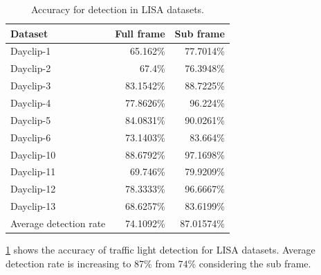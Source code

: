 \begin{table}[h!]
  \centering
  \caption{Accuracy for detection in LISA datasets.}
  \label{t:lisa_acc_stat}
  \begin{tabular}{  l  r  r }
    \rowcolor{gray!50}
    Dataset & Full frame & Sub frame \\
    \hline
    Dayclip-1 & 65.162\% & 77.7014\% \\
    Dayclip-2 & 67.4\% & 76.3948\% \\
    Dayclip-3 & 83.1542\% & 88.7225\% \\
    Dayclip-4 & 77.8626\% & 96.224\% \\
    Dayclip-5 & 84.0831\% & 90.0261\% \\
    Dayclip-6 & 73.1403\% & 83.664\% \\
    Dayclip-10 & 88.6792\% & 97.1698\% \\
    Dayclip-11 & 69.746\% & 79.9209\% \\
    Dayclip-12 & 78.3333\% & 96.6667\% \\
    Dayclip-13 & 68.6257\% & 83.6199\%\\
    \hline
    Average detection rate & 74.1092\% & 87.01574\% \\
  \end{tabular}
\end{table}

\ref{t:lisa_acc_stat} shows the accuracy of traffic light detection for LISA datasets.
Average detection rate is increasing to 87\% from 74\% considering the sub frame.




